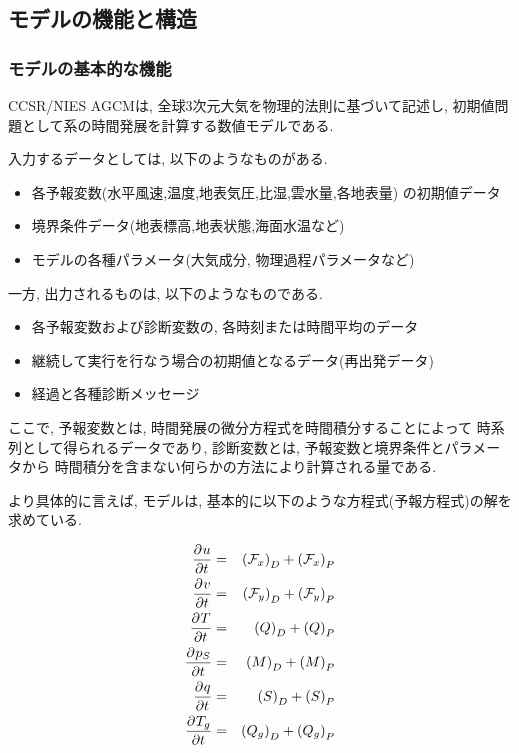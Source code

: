 ﻿%

\subsection{モデルの機能と構造}
\subsubsection{モデルの基本的な機能}

CCSR/NIES AGCMは, 全球3次元大気を物理的法則に基づいて記述し, 
初期値問題として系の時間発展を計算する数値モデルである.

入力するデータとしては, 以下のようなものがある.
\begin{itemize}
\item 各予報変数(水平風速,温度,地表気圧,比湿,雲水量,各地表量) の初期値データ
\item 境界条件データ(地表標高,地表状態,海面水温など)
\item モデルの各種パラメータ(大気成分, 物理過程パラメータなど)
\end{itemize}
%
一方, 出力されるものは, 以下のようなものである.
\begin{itemize}
\item 各予報変数および診断変数の, 各時刻または時間平均のデータ
\item 継続して実行を行なう場合の初期値となるデータ(再出発データ)
\item 経過と各種診断メッセージ
\end{itemize}
%
ここで, 予報変数とは, 時間発展の微分方程式を時間積分することによって
時系列として得られるデータであり,
診断変数とは, 予報変数と境界条件とパラメータから
時間積分を含まない何らかの方法により計算される量である.

より具体的に言えば,
モデルは, 基本的に以下のような方程式(予報方程式)の解を求めている.

\begin{eqnarray}
  \DP{u}{t} & = & \left( {\cal F}_x \right)_D + \left( {\cal F}_x \right)_P 
  \label{struct:u-eq-1} \\
  \DP{v}{t} & = & \left( {\cal F}_y \right)_D + \left( {\cal F}_y \right)_P \\
  \DP{T}{t} & = & \left( Q \right)_D + \left( Q \right)_P \\
  \DP{p_S}{t} & = & \left( M \right)_D + \left( M \right)_P \\
  \DP{q}{t} & = & \left( S \right)_D + \left( S \right)_P \\
  \DP{T_g}{t} & = & \left( Q_g \right)_D + \left( Q_g \right)_P 
\end{eqnarray}

